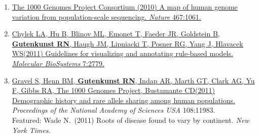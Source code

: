 \documentclass[11pt]{article}
\newcommand{\dadi}{dadi\xspace}
\begin{document}
\begin{enumerate}
\item
\href{http://doi.org/10.1038/nature09534}{{The 1000 Genomes Project Consortium} (2010) {A map of human genome variation
  from population-scale sequencing}.
\newblock \emph{Nature} 467:1061.}


\item
\href{http://doi.org/10.1039/C1MB05077J}{Chylek LA, Hu B, Blinov ML, Emonet T, Faeder JR, Goldstein B, \textbf{Gutenkunst RN},
  Haugh JM, Lipniacki T, Posner RG, Yang J, Hlavacek WS\corresponding (2011) {Guidelines for
  visualizing and annotating rule-based models}.
\newblock \emph{Molecular BioSystems} 7:2779.}

\item
\href{http://doi.org/10.1073/pnas.1019276108}{Gravel S, Henn BM, \textbf{Gutenkunst RN}, Indap AR, Marth GT, Clark AG, Yu F, Gibbs RA,
  {The 1000 Genomes Project}, Bustamante CD\corresponding (2011) {Demographic history and
  rare allele sharing among human populations}.}
\newblock \emph{Proceedings of the National Academy of Sciences USA} 108:11983.\\
 Featured: Wade N.\ (2011) Roots of disease found to vary by continent. \emph{New York Times}.


\end{enumerate}
\end{document}
